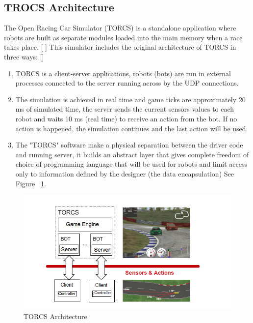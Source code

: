 \documentclass{llncs}
\begin{document}
\subsection {TROCS Architecture}
The Open Racing Car Simulator (TORCS) is a standalone application where robots are built as separate modules loaded into the main memory when a race takes place. [\cite{Torcs3} ]
This simulator includes the original architecture of TORCS in three ways: [\cite {manual}]
\begin{enumerate}
	\item TORCS is a client-server applications, robots (bots) are run in external processes connected to the server running across by the UDP connections.\\
	
	\item The simulation is achieved in real time and  game ticks are approximately 20 ms of simulated time, the server sends the current sensors values to each robot and waits 10 ms (real time) to receive an action from the bot.
	If no action is happened, the simulation continues and the last action will be used.\\
	
	\item The "TORCS" software make a physical separation between the driver code and running server, it builds an abstract layer that gives complete freedom of choice of programming language that will be used for robots and limit access only to information defined by the designer (the data encapsulation) See Figure ~\ref{architorcs}.
\end{enumerate}
\begin{figure}[h!]
	\centering
	\includegraphics[width=1.1\textwidth]{fig/arch2.PNG}
	\begin{minipage}{10cm}
		\centering
		
		\caption{\footnotesize TORCS Architecture}
		\label{architorcs}
	\end{minipage} 
\end{figure}
\end{document}
